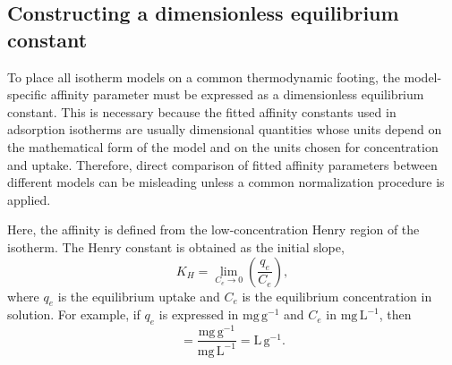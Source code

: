 \documentclass[journal=jacsat,manuscript=article]{achemso}
\begin{document}
\subsection{Constructing a dimensionless equilibrium constant}
\label{sec:dimensionless_K}

To place all isotherm models on a common thermodynamic footing, the model-specific affinity parameter must be expressed as a dimensionless equilibrium constant. This is necessary because the fitted affinity constants used in adsorption isotherms are usually dimensional quantities whose units depend on the mathematical form of the model and on the units chosen for concentration and uptake. Therefore, direct comparison of fitted affinity parameters between different models can be misleading unless a common normalization procedure is applied.

Here, the affinity is defined from the low-concentration Henry region of the isotherm. The Henry constant is obtained as the initial slope,
\begin{equation}
	K_H = \lim_{C_e \to 0} \left( \frac{q_e}{C_e} \right),
	\label{eq:Henry_constant}
\end{equation}
where $q_e$ is the equilibrium uptake and $C_e$ is the equilibrium concentration in solution. For example, if $q_e$ is expressed in $\mathrm{mg\,g^{-1}}$ and $C_e$ in $\mathrm{mg\,L^{-1}}$, then
\begin{equation}
	[K_H]
	=
	\frac{\mathrm{mg\,g^{-1}}}{\mathrm{mg\,L^{-1}}}
	=
	\mathrm{L\,g^{-1}}.
	\label{eq:KH_units}
\end{equation}
\end{document}
